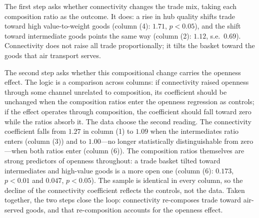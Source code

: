 The first step asks whether connectivity changes the trade mix, taking
each composition ratio as the outcome. It does: a rise in hub quality
shifts trade toward high value-to-weight goods (column (4): $1.71$,
$p<0.05$), and the shift toward intermediate goods points the same way
(column (2): $1.12$, s.e.\ $0.69$). Connectivity does not raise all
trade proportionally; it tilts the basket toward the goods that air
transport serves.

The second step asks whether this compositional change carries the
openness effect. The logic is a comparison across columns: if
connectivity raised openness through some channel unrelated to
composition, its coefficient should be unchanged when the composition
ratios enter the openness regression as controls; if the effect operates
through composition, the coefficient should fall toward zero while the
ratios absorb it. The data choose the second reading. The connectivity
coefficient falls from $1.27$ in column (1) to $1.09$ when the
intermediates ratio enters (column (3)) and to $1.00$---no longer
statistically distinguishable from zero---when both ratios enter (column
(6)). The composition ratios themselves are strong predictors of
openness throughout: a trade basket tilted toward intermediates and
high-value goods is a more open one (column (6): $0.173$, $p<0.01$ and
$0.047$, $p<0.05$). The sample is identical in every column, so the
decline of the connectivity coefficient reflects the controls, not the
data. Taken together, the two steps close the loop: connectivity
re-composes trade toward air-served goods, and that re-composition
accounts for the openness effect.

